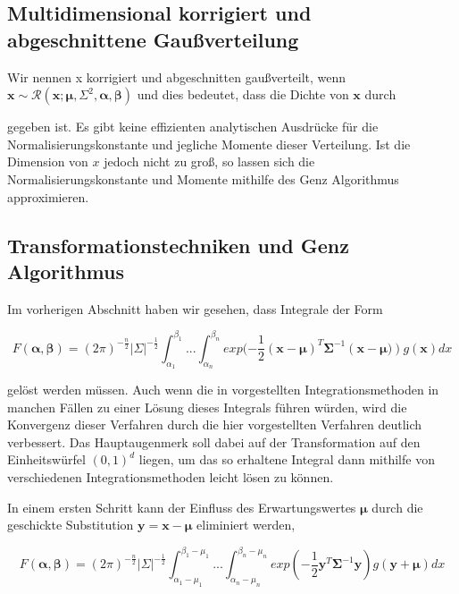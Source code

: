 \documentclass[12pt,a4paper]{scrartcl}
\numberwithin{equation}{section}
\begin{document}
\subsection{Multidimensional korrigiert und abgeschnittene Gaußverteilung}
Wir nennen x korrigiert und abgeschnitten gaußverteilt, wenn $\mathbf{x} \sim \mathcal{R}(\mathbf{x};\mathbf{\mu},\mathbf{\varSigma}^2,\mathbf{\alpha},\mathbf{\beta})$ und dies bedeutet, dass die Dichte von $\mathbf{x}$ durch 

gegeben ist.
Es gibt keine effizienten analytischen Ausdrücke für die Normalisierungskonstante und jegliche Momente dieser Verteilung. Ist die Dimension von $x$ jedoch nicht zu groß, so lassen sich die 
Normalisierungskonstante und Momente mithilfe des Genz Algorithmus approximieren. 

\subsection{Transformationstechniken und Genz Algorithmus}
Im vorherigen Abschnitt haben wir gesehen, dass Integrale der Form

\begin{equation}
 F(\mathbf{\alpha},\mathbf{\beta}) = (2\pi)^{-\frac{n}{2}} |\Sigma|^{-\frac{1}{2}} \int_{\alpha_1}^{\beta_1} ... \int_{\alpha_n}^{\beta_n} exp(-\frac{1}{2}(\mathbf{x}-\mathbf{\mu})^T \mathbf{\Sigma}^{-1}(\mathbf{x}-\mathbf{\mu)}) g(\mathbf{x}) dx
\end{equation}

gelöst werden müssen. 
Auch wenn die in vorgestellten Integrationsmethoden in manchen Fällen zu einer Lösung dieses Integrals führen würden, wird die Konvergenz dieser Verfahren durch die hier vorgestellten
Verfahren deutlich verbessert. Das Hauptaugenmerk soll dabei auf der Transformation auf den Einheitswürfel $(0,1)^d$ liegen, um das so erhaltene Integral dann mithilfe von verschiedenen
Integrationsmethoden leicht lösen zu können. 

In einem ersten Schritt kann der Einfluss des Erwartungswertes $\mathbf{\mu}$ durch die geschickte Substitution $\mathbf{y} = \mathbf{x} - \mathbf{\mu}$ eliminiert werden,

\begin{equation}
  F(\mathbf{\alpha},\mathbf{\beta}) = (2\pi)^{-\frac{n}{2}} |\Sigma|^{-\frac{1}{2}} \int_{\alpha_1 -\mu_1}^{\beta_1-\mu_1} ... \int_{\alpha_n - \mu_n}^{\beta_n - \mu_n} exp(-\frac{1}{2} \mathbf{y}^T \mathbf{\Sigma}^{-1}\mathbf{y}) g(\mathbf{y} + \mathbf{\mu}) dx
\end{equation}
\end{document}
